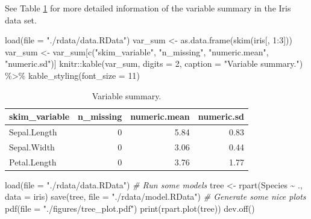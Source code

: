 \documentclass[
  11pt,
  oneside]{book}
\newenvironment{Shaded}{\begin{snugshade}}{\end{snugshade}}
\newcommand{\AttributeTok}[1]{\textcolor[rgb]{0.77,0.63,0.00}{#1}}
\newcommand{\CommentTok}[1]{\textcolor[rgb]{0.56,0.35,0.01}{\textit{#1}}}
\newcommand{\DecValTok}[1]{\textcolor[rgb]{0.00,0.00,0.81}{#1}}
\newcommand{\FunctionTok}[1]{\textcolor[rgb]{0.00,0.00,0.00}{#1}}
\newcommand{\NormalTok}[1]{#1}
\newcommand{\OtherTok}[1]{\textcolor[rgb]{0.56,0.35,0.01}{#1}}
\newcommand{\SpecialCharTok}[1]{\textcolor[rgb]{0.00,0.00,0.00}{#1}}
\newcommand{\StringTok}[1]{\textcolor[rgb]{0.31,0.60,0.02}{#1}}
\begin{document}
See Table \ref{tab:sumTab} for more detailed information of the variable summary in the Iris data set.

\begin{Shaded}
\begin{Highlighting}[]
\FunctionTok{load}\NormalTok{(}\AttributeTok{file =} \StringTok{"./rdata/data.RData"}\NormalTok{)}
\NormalTok{var\_sum }\OtherTok{\textless{}{-}} \FunctionTok{as.data.frame}\NormalTok{(}\FunctionTok{skim}\NormalTok{(iris[, }\DecValTok{1}\SpecialCharTok{:}\DecValTok{3}\NormalTok{]))}
\NormalTok{var\_sum }\OtherTok{\textless{}{-}}\NormalTok{ var\_sum[}\FunctionTok{c}\NormalTok{(}\StringTok{"skim\_variable"}\NormalTok{, }\StringTok{"n\_missing"}\NormalTok{, }\StringTok{"numeric.mean"}\NormalTok{,}
    \StringTok{"numeric.sd"}\NormalTok{)]}
\NormalTok{knitr}\SpecialCharTok{::}\FunctionTok{kable}\NormalTok{(var\_sum, }\AttributeTok{digits =} \DecValTok{2}\NormalTok{, }\AttributeTok{caption =} \StringTok{"Variable summary."}\NormalTok{) }\SpecialCharTok{\%\textgreater{}\%}
    \FunctionTok{kable\_styling}\NormalTok{(}\AttributeTok{font\_size =} \DecValTok{11}\NormalTok{)}
\end{Highlighting}
\end{Shaded}

\begin{table}

\caption{\label{tab:sumTab}Variable summary.}
\centering
\fontsize{11}{13}\selectfont
\begin{tabular}[t]{l|r|r|r}
\hline
skim\_variable & n\_missing & numeric.mean & numeric.sd\\
\hline
Sepal.Length & 0 & 5.84 & 0.83\\
\hline
Sepal.Width & 0 & 3.06 & 0.44\\
\hline
Petal.Length & 0 & 3.76 & 1.77\\
\hline
\end{tabular}
\end{table}

\begin{Shaded}
\begin{Highlighting}[]
\FunctionTok{load}\NormalTok{(}\AttributeTok{file =} \StringTok{"./rdata/data.RData"}\NormalTok{)}
\CommentTok{\# Run some models}
\NormalTok{tree }\OtherTok{\textless{}{-}} \FunctionTok{rpart}\NormalTok{(Species }\SpecialCharTok{\textasciitilde{}}\NormalTok{ ., }\AttributeTok{data =}\NormalTok{ iris)}
\FunctionTok{save}\NormalTok{(tree, }\AttributeTok{file =} \StringTok{"./rdata/model.RData"}\NormalTok{)}
\CommentTok{\# Generate some nice plots}
\FunctionTok{pdf}\NormalTok{(}\AttributeTok{file =} \StringTok{"./figures/tree\_plot.pdf"}\NormalTok{)}
\FunctionTok{print}\NormalTok{(}\FunctionTok{rpart.plot}\NormalTok{(tree))}
\FunctionTok{dev.off}\NormalTok{()}
\end{Highlighting}
\end{Shaded}
\end{document}
